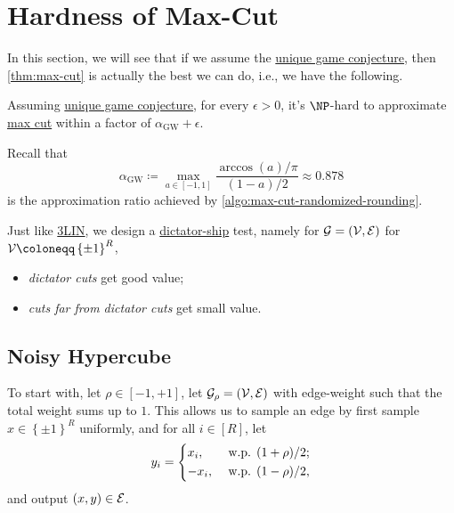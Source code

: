 \section{Hardness of Max-Cut}
In this section, we will see that if we assume the \hyperref[conj:unique-game]{unique game conjecture}, then \autoref{thm:max-cut} is actually the best we can do, i.e., we have the following.

\begin{theorem}[\cite{1366234}]\label{thm:max-cut}
	Assuming \hyperref[conj:unique-game]{unique game conjecture}, for every \(\epsilon > 0 \), it's \(\NP\)-hard to approximate \hyperref[prb:max-cut]{max cut}  within a factor of \(\alpha _{\mathrm{GW} }+\epsilon \).
\end{theorem}

\begin{prev}
	Recall that
	\[
		\alpha _{\mathrm{GW} } \coloneqq \max _{a\in [-1, 1]}\frac{\arccos (a) / \pi }{(1 - a) / 2} \approx 0.878
	\]
	is the approximation ratio achieved by \autoref{algo:max-cut-randomized-rounding}.
\end{prev}

Just like \hyperref[prb:max-3LIN]{3LIN}, we design a \hyperref[not:dictation]{dictator-ship} test, namely for \(\mathcal{\MakeUppercase{g}} =(\mathcal{\MakeUppercase{v}} , \mathcal{\MakeUppercase{e}} )\) for \(\mathcal{\MakeUppercase{v}} \coloneqq \left\{ \pm 1 \right\} ^R\),
\begin{itemize}
	\item \emph{dictator cuts} get good value;
	\item \emph{cuts far from dictator cuts} get small value.
\end{itemize}

\subsection{Noisy Hypercube}
To start with, let \(\rho \in [-1, +1]\), let \(\mathcal{\MakeUppercase{g}} _{\rho} = (\mathcal{\MakeUppercase{v}} , \mathcal{\MakeUppercase{e}} )\) with edge-weight such that the total weight sums up to \(1\). This allows us to sample an edge by first sample \(x\in \left\{ \pm 1 \right\} ^R\) uniformly, and for all \(i\in [R]\), let
\[
	y_i = \begin{dcases}
		x_i,  & \text{ w.p. } (1 + \rho ) / 2 ; \\
		-x_i, & \text{ w.p. } (1 - \rho ) / 2,
	\end{dcases}
\]
and output \((x, y)\in \mathcal{\MakeUppercase{e}} \).


